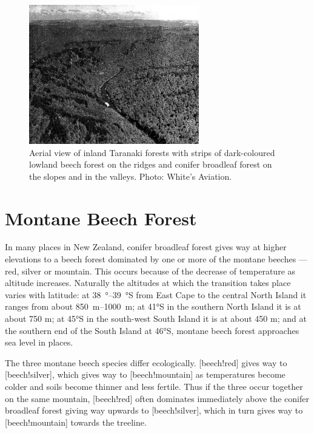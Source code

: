 \begin{figure}
	\includegraphics[width=0.66\textwidth]{graphics/figure73taranaki-forests.jpg}
	\centering
	\caption[Aerial view of inland Taranaki forests]{Aerial view of inland Taranaki forests with strips of dark-coloured lowland beech forest on the ridges and conifer broadleaf forest on the slopes and in the valleys.
	Photo: White's Aviation.}%
	\label{fig:73taranaki-forests}
\end{figure}

\section{Montane Beech Forest}

In many places in New Zealand, conifer broadleaf forest gives way at higher elevations to a beech forest dominated by one or more of the montane beeches --- red, silver or mountain.
This occurs because of the decrease of temperature as altitude increases.
Naturally the altitudes at which the transition takes place varies with latitude: at \SIrange{38}{39}{\degree}S from East Cape to the central North Island it ranges from about \SIrange{850}{1000}{\metre}; at \ang{41}S in the southern North Island it is at about 750 m; at \ang{45}S in the south-west South Island it is at about 450 m; and at the southern end of the South Island at \ang{46}S, montane beech forest approaches sea level in places.

The three montane beech species differ ecologically.
[beech!red] gives way to [beech!silver], which gives way to [beech!mountain] as temperatures become colder and soils become thinner and less fertile.
Thus if the three occur together on the same mountain, [beech!red] often dominates immediately above the conifer broadleaf forest giving way upwards to [beech!silver], which in turn gives way to [beech!mountain] towards the treeline.


